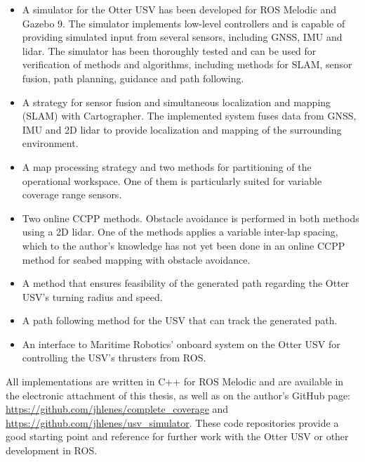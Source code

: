 \begin{itemize}

\item A simulator for the Otter USV has been developed for ROS Melodic and Gazebo 9. The simulator implements low-level controllers and is capable of providing simulated input from several sensors, including GNSS, IMU and lidar. The simulator has been thoroughly tested and can be used for verification of methods and algorithms, including methods for SLAM, sensor fusion, path planning, guidance and path following.

\item A strategy for sensor fusion and simultaneous localization and mapping (SLAM) with Cartographer. The implemented system fuses data from GNSS, IMU and 2D lidar to provide localization and mapping of the surrounding environment.

\item A map processing strategy and two methods for partitioning of the operational workspace. One of them is particularly suited for variable coverage range sensors.

\item Two online CCPP methods. Obstacle avoidance is performed in both methods using a 2D lidar. One of the methods applies a variable inter-lap spacing, which to the author's knowledge has not yet been done in an online CCPP method for seabed mapping with obstacle avoidance. 

\item A method that ensures feasibility of the generated path regarding the Otter USV's turning radius and speed.

\item A path following method for the USV that can track the generated path.

\item An interface to Maritime Robotics' onboard system on the Otter USV for controlling the USV's thrusters from ROS.

\end{itemize}

\noindent All implementations are written in C++ for ROS Melodic and are available in the electronic attachment of this thesis, as well as on the author's GitHub page: \url{https://github.com/jhlenes/complete_coverage} and \url{https://github.com/jhlenes/usv_simulator}. These code repositories provide a good starting point and reference for further work with the Otter USV or other development in ROS.

